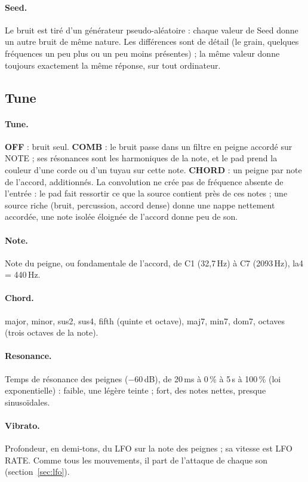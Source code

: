 \documentclass[a4paper,11pt]{article}
\newcommand{\ctl}[1]{\textsf{\textbf{#1}}}   %
\newcommand{\dB}{\,dB}
\begin{document}
\paragraph{Seed.} Le bruit est tiré d'un générateur pseudo-aléatoire : chaque valeur de Seed donne
un autre bruit de même nature. Les différences sont de détail (le \og grain\fg, quelques fréquences
un peu plus ou un peu moins présentes) ; la même valeur donne toujours exactement la même réponse,
sur tout ordinateur.

\subsection{Tune}

\paragraph{Tune.} \ctl{OFF} : bruit seul. \ctl{COMB} : le bruit passe dans un filtre en peigne
accordé sur NOTE ; ses résonances sont les harmoniques de la note, et le pad prend la couleur d'une
corde ou d'un tuyau sur cette note. \ctl{CHORD} : un peigne par note de l'accord, additionnés. La
convolution ne crée pas de fréquence absente de l'entrée : le pad fait ressortir ce que la source
contient près de ces notes ; une source riche (bruit, percussion, accord dense) donne une nappe
nettement accordée, une note isolée éloignée de l'accord donne peu de son.

\paragraph{Note.} Note du peigne, ou fondamentale de l'accord, de C1 (32,7\,Hz) à C7 (2093\,Hz),
la4 = 440\,Hz.

\paragraph{Chord.} major, minor, sus2, sus4, fifth (quinte et octave), maj7, min7, dom7, octaves
(trois octaves de la note).

\paragraph{Resonance.} Temps de résonance des peignes ($-60$\dB), de 20\,ms à 0\,\% à 5\,s à
100\,\% (loi exponentielle) : faible, une légère teinte ; fort, des notes nettes, presque
sinusoïdales.

\paragraph{Vibrato.} Profondeur, en demi-tons, du LFO sur la note des peignes ; sa vitesse est
LFO RATE. Comme tous les mouvements, il part de l'attaque de chaque son (section~\ref{sec:lfo}).
\end{document}
